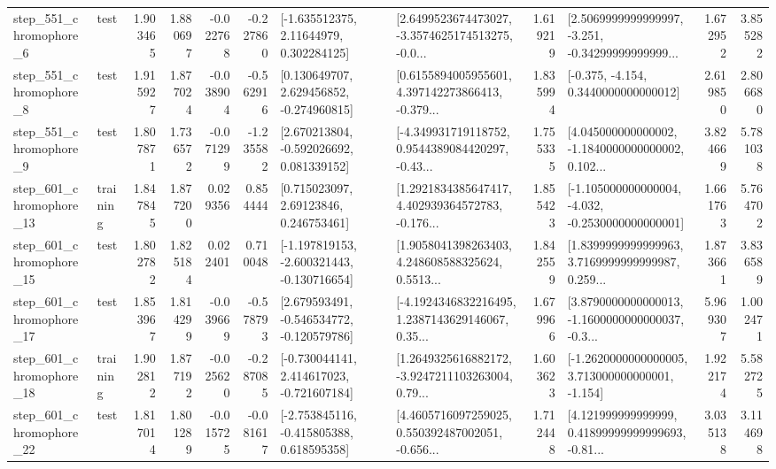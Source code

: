 \begin{tabular}{llrrrrllrlrr}
   step\_551\_chromophore\_6 &      test &      1.903465 &    1.880697 &     -0.022768 & -0.227860 &     [-1.635512375, 2.11644979, 0.302284125] &  [2.6499523674473027, -3.3574625174513275, -0.0... &       1.619219 &  [2.5069999999999997, -3.251, -0.34299999999999... &            1.672952 &          3.855282 \\
   step\_551\_chromophore\_8 &      test &      1.915927 &    1.877024 &     -0.038904 & -0.562916 &    [0.130649707, 2.629456852, -0.274960815] &  [0.6155894005955601, 4.397142273866413, -0.379... &       1.835994 &               [-0.375, -4.154, 0.3440000000000012] &            2.619850 &          2.806680 \\
   step\_551\_chromophore\_9 &      test &      1.807871 &    1.736572 &     -0.071299 & -1.235582 &    [2.670213804, -0.592026692, 0.081339152] &  [-4.349931719118752, 0.9544389084420297, -0.43... &       1.755335 &  [4.045000000000002, -1.1840000000000002, 0.102... &            3.824669 &          5.781038 \\
  step\_601\_chromophore\_13 &  training &      1.847845 &    1.877200 &      0.029356 &  0.854444 &      [0.715023097, 2.69123846, 0.246753461] &  [1.2921834385647417, 4.402939364572783, -0.176... &       1.855423 &  [-1.105000000000004, -4.032, -0.2530000000000001] &            1.661763 &          5.764702 \\
  step\_601\_chromophore\_15 &      test &      1.802782 &    1.825184 &      0.022401 &  0.710048 &  [-1.197819153, -2.600321443, -0.130716654] &  [1.9058041398263403, 4.248608588325624, 0.5513... &       1.842559 &  [1.8399999999999963, 3.7169999999999987, 0.259... &            1.873661 &          3.836589 \\
  step\_601\_chromophore\_17 &      test &      1.853967 &    1.814299 &     -0.039669 & -0.578793 &   [2.679593491, -0.546534772, -0.120579786] &  [-4.1924346832216495, 1.2387143629146067, 0.35... &       1.679966 &  [3.8790000000000013, -1.1600000000000037, -0.3... &            5.969307 &          1.002471 \\
  step\_601\_chromophore\_18 &  training &      1.902812 &    1.877192 &     -0.025620 & -0.287085 &   [-0.730044141, 2.414617023, -0.721607184] &  [1.2649325616882172, -3.9247211103263004, 0.79... &       1.603623 &   [-1.2620000000000005, 3.713000000000001, -1.154] &            1.922174 &          5.582725 \\
  step\_601\_chromophore\_22 &      test &      1.817014 &    1.801289 &     -0.015725 & -0.081617 &   [-2.753845116, -0.415805388, 0.618595358] &  [4.4605716097259025, 0.550392487002051, -0.656... &       1.712448 &  [4.121999999999999, 0.41899999999999693, -0.81... &            3.035138 &          3.114698 \\

\end{tabular}
